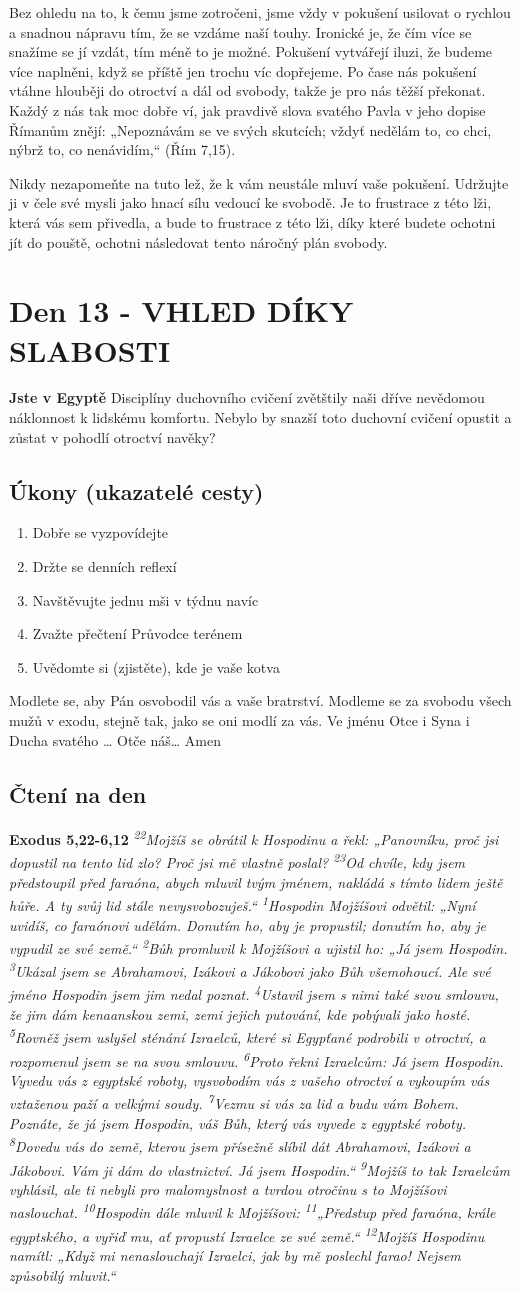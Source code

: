\documentclass[11pt]{article}
\newcommand{\zacatekDruhyTyden}{
  \textbf{Jste v Egyptě} \newline
  Disciplíny duchovního cvičení zvětštily naši dříve nevědomou náklonnost k lidskému komfortu.
  Nebylo by snazší toto duchovní cvičení opustit a zůstat v pohodlí otroctví navěky?

  \subsection*{Úkony (ukazatelé cesty)}
\begin{enumerate}
  \item Dobře se vyzpovídejte
  \item Držte se denních reflexí
  \item Navštěvujte jednu mši v týdnu navíc
  \item Zvažte přečtení Průvodce terénem
  \item Uvědomte si (zjistěte), kde je vaše kotva
\end{enumerate}
Modlete se, aby Pán osvobodil vás a vaše bratrství. \newline
Modleme se za svobodu všech mužů v exodu, stejně tak, jako se oni modlí za vás.\newline
Ve jménu Otce i Syna i Ducha svatého …  Otče náš… Amen
}
\begin{document}
Bez ohledu na to, k čemu jsme zotročeni, jsme vždy v pokušení usilovat o rychlou a snadnou nápravu tím, že se
vzdáme naší touhy. Ironické je, že čím více se snažíme se jí vzdát, tím méně to je možné. Pokušení vytvářejí iluzi,
že budeme více naplněni, když se příště jen trochu víc dopřejeme. Po čase nás pokušení vtáhne hlouběji do otroctví
a dál od svobody, takže je pro nás těžší překonat. Každý z nás tak moc dobře ví, jak pravdivě slova svatého Pavla v
jeho dopise Římanům znějí: „Nepoznávám se ve svých skutcích; vždyť nedělám to, co chci, nýbrž to, co
nenávidím,“ (Řím 7,15).

Nikdy nezapomeňte na tuto lež, že k vám neustále mluví vaše pokušení. Udržujte ji v čele své mysli jako hnací sílu
vedoucí ke svobodě. Je to frustrace z této lži, která vás sem přivedla, a bude to frustrace z této lži, díky které budete
ochotni jít do pouště, ochotni následovat tento náročný plán svobody.

\newpage
\section{Den 13 - VHLED DÍKY SLABOSTI}
\zacatekDruhyTyden
\subsection*{Čtení na den}
\textbf{Exodus 5,22-6,12}
\newline
\textit{
\textsuperscript{22}Mojžíš se obrátil k Hospodinu a řekl: „Panovníku, proč jsi dopustil na tento lid zlo? Proč jsi mě vlastně poslal?
\textsuperscript{23}Od chvíle, kdy jsem předstoupil před faraóna, abych mluvil tvým jménem, nakládá s tímto lidem ještě hůře. A ty svůj lid stále nevysvobozuješ.“
\textsuperscript{1}Hospodin Mojžíšovi odvětil: „Nyní uvidíš, co faraónovi udělám. Donutím ho, aby je propustil; donutím ho, aby je vypudil ze své země.“
\textsuperscript{2}Bůh promluvil k Mojžíšovi a ujistil ho: „Já jsem Hospodin.
\textsuperscript{3}Ukázal jsem se Abrahamovi, Izákovi a Jákobovi jako Bůh všemohoucí. Ale své jméno Hospodin jsem jim nedal poznat.
\textsuperscript{4}Ustavil jsem s nimi také svou smlouvu, že jim dám kenaanskou zemi, zemi jejich putování, kde pobývali jako hosté.
\textsuperscript{5}Rovněž jsem uslyšel sténání Izraelců, které si Egypťané podrobili v otroctví, a rozpomenul jsem se na svou smlouvu.
\textsuperscript{6}Proto řekni Izraelcům: Já jsem Hospodin. Vyvedu vás z egyptské roboty, vysvobodím vás z vašeho otroctví a vykoupím vás vztaženou paží a velkými soudy.
\textsuperscript{7}Vezmu si vás za lid a budu vám Bohem. Poznáte, že já jsem Hospodin, váš Bůh, který vás vyvede z egyptské roboty.
\textsuperscript{8}Dovedu vás do země, kterou jsem přísežně slíbil dát Abrahamovi, Izákovi a Jákobovi. Vám ji dám do vlastnictví. Já jsem Hospodin.“
\textsuperscript{9}Mojžíš to tak Izraelcům vyhlásil, ale ti nebyli pro malomyslnost a tvrdou otročinu s to Mojžíšovi naslouchat.
\textsuperscript{10}Hospodin dále mluvil k Mojžíšovi:
\textsuperscript{11}„Předstup před faraóna, krále egyptského, a vyřiď mu, ať propustí Izraelce ze své země.“
\textsuperscript{12}Mojžíš Hospodinu namítl: „Když mi nenaslouchají Izraelci, jak by mě poslechl farao! Nejsem způsobilý mluvit.“
}
\end{document}
